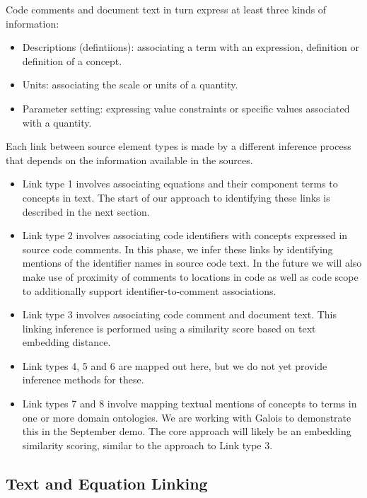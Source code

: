 \documentclass[article, 12pt, oneside]{memoir}
\begin{document}
Code comments and document text in turn express at least three kinds of
information:

\begin{itemize}
\tightlist
\item
  Descriptions (defintiions): associating a term with an expression,
  definition or definition of a concept.
\item
  Units: associating the scale or units of a quantity.
\item
  Parameter setting: expressing value constraints or specific values
  associated with a quantity.
\end{itemize}

Each link between source element types is made by a different inference
process that depends on the information available in the sources.

\begin{itemize}
\tightlist
\item
  Link type 1 involves associating equations and their component terms
  to concepts in text. The start of our approach to identifying these
  links is described in the next section.
\item
  Link type 2 involves associating code identifiers with concepts
  expressed in source code comments. In this phase, we infer these links
  by identifying mentions of the identifier names in source code text.
  In the future we will also make use of proximity of comments to
  locations in code as well as code scope to additionally support
  identifier-to-comment associations.
\item
  Link type 3 involves associating code comment and document text. This
  linking inference is performed using a similarity score based on text
  embedding distance.
\item
  Link types 4, 5 and 6 are mapped out here, but we do not yet provide
  inference methods for these.
\item
  Link types 7 and 8 involve mapping textual mentions of concepts to
  terms in one or more domain ontologies. We are working with Galois to
  demonstrate this in the September demo. The core approach will likely
  be an embedding similarity scoring, similar to the approach to Link
  type 3.
\end{itemize}

\hypertarget{text-and-equation-linking}{%
\subsection{Text and Equation Linking}\label{text-and-equation-linking}}
\end{document}
